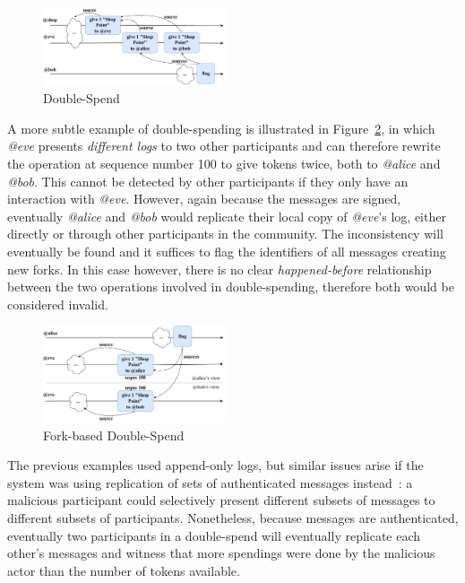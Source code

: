 \documentclass[sigconf,9pt]{acmart}
\begin{document}
\begin{figure}[htbp]
\includegraphics[width=0.48\textwidth]{figures/double-spend-drawio}
\caption{Double-Spend}
\label{figure:double-spend}
\end{figure}

A more subtle example of double-spending is illustrated in Figure~\ref{figure:fork-double-spend}, in which \textit{@eve} presents \textit{different logs} to two other participants and can therefore rewrite the operation at sequence number 100 to give tokens twice, both to \textit{@alice} and \textit{@bob}. This cannot be detected by other participants if they only have an interaction with \textit{@eve}. However, again because the messages are signed, eventually \textit{@alice} and \textit{@bob} would replicate their local copy of \textit{@eve}'s log, either directly or through other participants in the community. The inconsistency will eventually be found and it suffices to flag the identifiers of all messages creating new forks. In this case however, there is no clear \textit{happened-before} relationship between the two operations involved in double-spending, therefore both would be considered invalid.

\begin{figure}[htbp]
\centering
\includegraphics[width=0.48\textwidth]{figures/fork-double-spend-drawio}
\caption{Fork-based Double-Spend}
\label{figure:fork-double-spend}
\end{figure}

The previous examples used append-only logs, but similar issues arise if the system was using replication of sets of authenticated messages instead~\cite{meyer2021setreconciliation}: a malicious participant could selectively present different subsets of messages to different subsets of participants. Nonetheless, because messages are authenticated, eventually two participants in a double-spend will eventually replicate each other's messages and witness that more spendings were done by the malicious actor than the number of tokens available.
\end{document}
